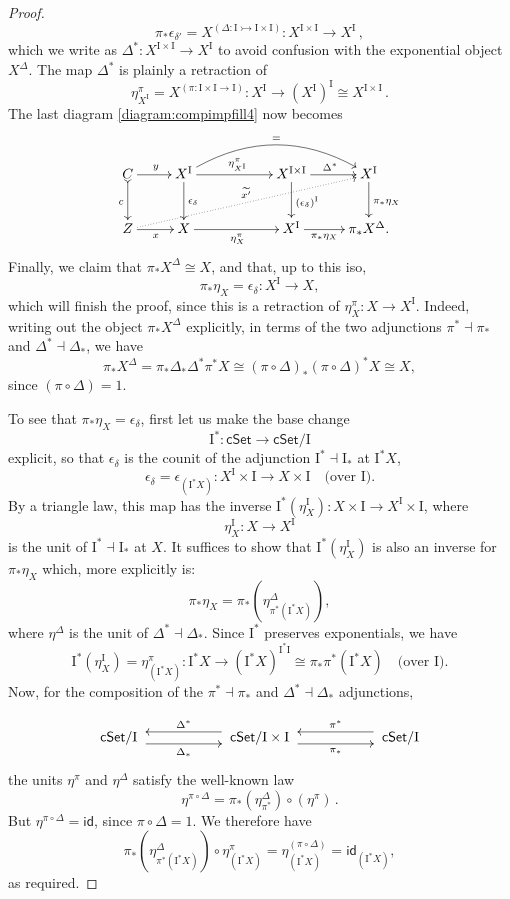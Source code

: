 \documentclass[12pt]{article}
\newcommand{\cSet}{\ensuremath{\mathsf{cSet}}}
\newcommand{\mono}{\ensuremath{\rightarrowtail}}
\newcommand{\ra}{\ensuremath{\rightarrow}}
\newcommand{\I}{\ensuremath{\mathrm{I}}}
\theoremstyle{remark}
\theoremstyle{definition}
\begin{document}
\begin{proof}
\[
\pi_*{\epsilon_{\delta'}} = X^{(\Delta: \I \mono \I\times\I)} : X^{\I\times\I} \ra X^\I\,,
\]
which we write as $\Delta^* : X^{\I\times\I} \ra X^\I$ to avoid confusion with the exponential object $X^\Delta$.
The map $\Delta^* $ is plainly a retraction of 
\[
\eta^{\pi}_{X^\I} = X^{(\pi: \I\times\I\ra \I)}: X^\I \ra (X^\I)^\I \cong X^{\I\times\I}\,.
\]
The last diagram \eqref{diagram:compimpfill4} now becomes
\begin{equation}\label{diagram:compimpfill5}
\xymatrix{
C \ar@{>->}[d]_{c} \ar[r]^y  & X^\I \ar[d]^{\epsilon_\delta} \ar[rr]^{\eta^{\pi}_{X^\I}}  \ar@/^5ex/ [rrr] ^{=}
	&&  X^{\I\times\I}  \ar[d]^{(\epsilon_\delta)^\I} \ar[r]^{\Delta^*}  &  X^\I   \ar[d]^{\pi_*\eta_X} \\
Z \ar[r]_x \ar@{..>}[rrrru]^{\widetilde{x'}} & X \ar[rr]_{\eta^\pi_X} 
	&& X^\I \ar[r]_-{\pi_*\eta_X} & \pi_*X^\Delta.
}
\end{equation}
Finally, we claim that $\pi_*X^\Delta \cong X$, and that, up to this iso,  $$\pi_*\eta_X = \epsilon_\delta : X^\I\ra X,$$ which will finish the proof, since this is a retraction of $\eta^\pi_X : X\ra X^\I$.  Indeed, writing out the object $\pi_*X^\Delta$ explicitly, in terms of the two adjunctions $\pi^* \dashv {\pi}_*$ and $\Delta^* \dashv \Delta_*$, we have
\[
\pi_*X^\Delta = \pi_*\Delta_*\Delta^*\pi^*X \cong (\pi\circ\Delta)_*(\pi\circ\Delta)^*X \cong X,
\]
since $(\pi\circ\Delta) = 1$.  

To see that $\pi_*\eta_X = \epsilon_\delta$, first let us make the base change $$\I^* : \cSet \ra \cSet/\I$$ explicit, so that $\epsilon_\delta$ is the counit of the adjunction $\I^* \dashv \I_*$ at $\I^*X$,
\[
\epsilon_\delta = \epsilon_{(\I^*X)} : X^\I \times \I \ra X\times \I \quad\text{(over $\I$)}.
\]  
By a triangle law, this map has the inverse $\I^*(\eta_{X}^\I) : X\times\I \ra X^\I \times \I$, where $$\eta_X^\I : X \ra X^\I$$ is the unit of $\I^*\dashv \I_*$ at $X$.  It suffices to show that $\I^*(\eta_{X}^\I)$ is also an inverse for $\pi_*\eta_X$ which, more explicitly is:
\[
\pi_*\eta_X = \pi_*(\eta^\Delta_{\pi^*(\I^*X)}),
\]
where $\eta^\Delta$ is the unit of $\Delta^* \dashv \Delta_*$. Since $\I^*$ preserves exponentials, we have
\[
\I^*(\eta_{X}^\I) = \eta_{(\I^*X)}^\pi : \I^*X \ra (\I^*X)^{\I^*\I} \cong \pi_*\pi^*(\I^*X)\quad\text{(over $\I$)}.
\]
Now, for the composition of the $\pi^* \dashv {\pi}_*$ and $\Delta^* \dashv \Delta_*$ adjunctions, 

\begin{equation}\label{diagram:Deltapibasechange}
\xymatrix{
\cSet/\I\ \ar@<-1ex>[rr]_-{\Delta_*}  && \ar@<-1ex>[ll]_-{\Delta^*} \ \cSet/\I\times\I \ \ar@<-1ex>[rr]_-{\pi_*}  
	&& \ar@<-1ex>[ll]_-{\pi^*} \ \cSet/\I 
}
\end{equation}
the units $\eta^\pi$ and $\eta^\Delta$ satisfy the well-known law
\[
\eta^{\pi\circ\Delta} = \pi_*(\eta^{\Delta}_{\pi^*}) \circ (\eta^\pi)\,.
\]
But $\eta^{\pi\circ\Delta} = \mathsf{id}$, since $\pi\circ\Delta =1$.  We therefore have 
\[
\pi_*(\eta^\Delta_{\pi^*(\I^*X)}) \circ \eta_{(\I^*X)}^\pi = \eta^{(\pi\circ\Delta)}_{(\I^*X)} = \mathsf{id}_{(\I^*X)},
\]
as required.
\end{proof}
\end{document}
